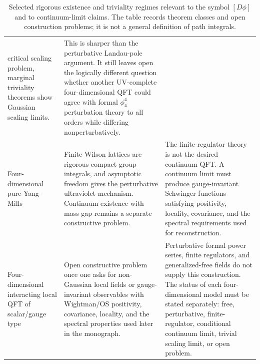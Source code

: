 \begin{table}[H]
\begin{tabular}{@{}>{\raggedright\arraybackslash}p{}
  >{\raggedright\arraybackslash}p{}
  >{\raggedright\arraybackslash}p{}@{}}
critical scaling problem, marginal triviality theorems show Gaussian scaling
limits. &
This is sharper than the perturbative Landau-pole argument.  It still leaves
open the logically different question whether another UV-complete
four-dimensional QFT could agree with formal \(\phi^4_4\) perturbation theory
to all orders while differing nonperturbatively. \\
Four-dimensional pure Yang--Mills &
Finite Wilson lattices are rigorous compact-group integrals, and asymptotic
freedom gives the perturbative ultraviolet mechanism.  Continuum existence
with mass gap remains a separate constructive problem. &
The finite-regulator theory is not the desired continuum QFT.  A continuum
limit must produce gauge-invariant Schwinger functions satisfying positivity,
locality, covariance, and the spectral requirements used for reconstruction. \\
Four-dimensional interacting local QFT of scalar/gauge type &
Open constructive problem once one asks for non-Gaussian local fields or
gauge-invariant observables with Wightman/OS positivity, covariance, locality,
and the spectral properties used later in the monograph. &
Perturbative formal power series, finite regulators, and generalized-free
fields do not supply this construction.  The status of each four-dimensional
model must be stated separately: free, perturbative, finite-regulator,
conditional continuum limit, trivial scaling limit, or open problem. \\
\hline
\end{tabular}
\caption{Selected rigorous existence and triviality regimes relevant to the
symbol \([D\phi]\) and to continuum-limit claims.  The table records theorem
classes and open construction problems; it is not a general definition of path
integrals.}
\label{tab:constructive-qft-status-catalog}
\end{table}


